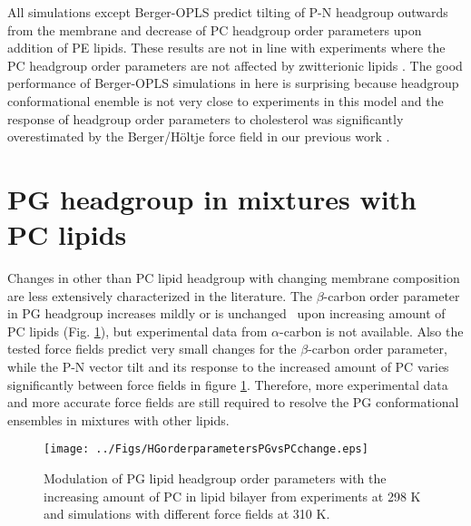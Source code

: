 \documentclass[journal=jpcbfk]{achemso}
\begin{document}
All simulations except Berger-OPLS predict tilting of P-N headgroup outwards from the membrane and
decrease of PC headgroup order parameters upon addition of PE lipids.
These results are not in line with experiments where the PC headgroup order parameters are not affected by zwitterionic lipids \cite{scherer87}.
The good performance of Berger-OPLS simulations in here is surprising because
headgroup conformational enemble is not very close to experiments in this model and
the response of headgroup order parameters
to cholesterol was significantly overestimated by the Berger/H{\"o}ltje force field in our previous work \cite{botan15}.

\clearpage
\section{PG headgroup in mixtures with PC lipids}
Changes in other than PC lipid headgroup with changing membrane composition are less
extensively characterized in the literature.
The $\beta$-carbon order parameter in PG headgroup increases
mildly \cite{macdonald87} or is unchanged~\cite{borle85} upon increasing amount
of PC lipids (Fig. \ref{HGorderparametersPGvsPCchange}), but experimental data from
$\alpha$-carbon is not available. Also the tested force fields predict very small changes
for the $\beta$-carbon order parameter, while the P-N vector tilt and its response to the
increased amount of PC varies significantly between force fields in figure \ref{HGorderparametersPGvsPCchange}. 
Therefore, more experimental data and more accurate force fields are still required
to resolve the PG conformational ensembles in mixtures with other lipids.
\begin{figure}[]
  \centering
  \texttt{[image: ../Figs/HGorderparametersPGvsPCchange.eps]}
  \caption{\label{HGorderparametersPGvsPCchange}
    Modulation of PG lipid headgroup order parameters with the increasing amount of PC in lipid bilayer
    from experiments at 298 K \cite{borle85,macdonald87} and simulations with different force fields at 310 K.
  }
\end{figure}
\end{document}
